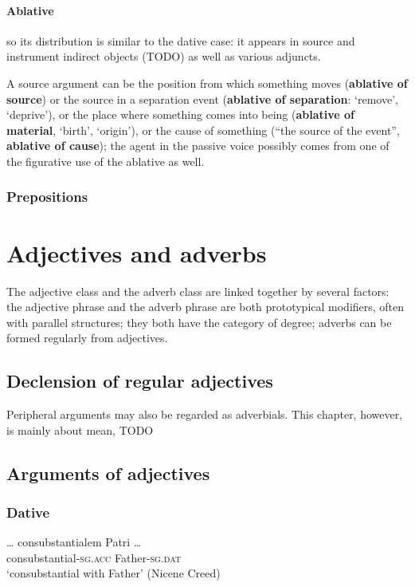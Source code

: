 \documentclass[a4paper, oneside, 12pt]{report}
\newcommand*{\concept}[1]{\textbf{#1}}
\newcommand*{\category}[1]{\textsc{#1}}
\newcommand{\translate}[1]{`#1'}
\begin{document}
\subsubsection{Ablative}

so its distribution is similar to the dative case: 
it appears in source and instrument indirect objects (TODO) 
as well as various adjuncts.

A source argument
can be the position from which something moves 
(\concept{ablative of source})
or the source in a separation event 
(\concept{ablative of separation}: \translate{remove}, \translate{deprive}),
or the place where something comes into being 
(\concept{ablative of material}, \translate{birth}, \translate{origin}), 
or the cause of something (``the source of the event'', \concept{ablative of cause});
the agent in the passive voice possibly 
comes from one of the figurative use of the ablative as well.

\subsection{Prepositions}

\chapter{Adjectives and adverbs}

The adjective class and the adverb class are linked together by several factors:
the adjective phrase and the adverb phrase are both prototypical modifiers,
often with parallel structures;
they both have the category of degree; 
adverbs can be formed regularly from adjectives.

\section{Declension of regular adjectives}

Peripheral arguments may also be regarded as adverbials.
This chapter, however, is mainly about mean, TODO

\section{Arguments of adjectives}

\subsection{Dative}

\begin{exe}
    \ex \gll \dots {} consubstantialem Patri \dots \\
    {} consubstantial-\category{sg.acc} Father-\category{sg.dat} \\
    \glt \translate{consubstantial with Father} (Nicene Creed)
\end{exe}
\end{document}
